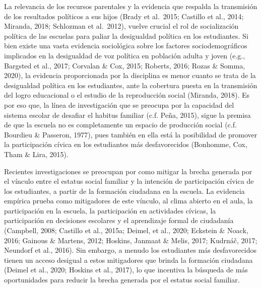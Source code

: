 \documentclass[12pt,twoside]{templates/facsothesis}
\begin{document}
La relevancia de los recursos parentales y la evidencia que respalda la transmisión de los resultados políticos a sus hijos (Brady et al.~2015; Castillo et al., 2014; Miranda, 2018; Schlozman et al.~2012), vuelve crucial el rol de socialización política de las escuelas para paliar la desigualdad política en los estudiantes. Si bien existe una vasta evidencia sociológica sobre los factores sociodemográficos implicados en la desigualdad de voz política en población adulta y joven (e.g., Bargsted et al., 2017; Corvalan \& Cox, 2015; Roberts, 2016; Rozas \& Somma, 2020), la evidencia proporcionada por la disciplina es menor cuanto se trata de la desigualdad política en los estudiantes, ante la cobertura puesta en la transmisión del logro educacional o el estudio de la reproducción social (Miranda, 2018). Es por eso que, la línea de investigación que se preocupa por la capacidad del sistema escolar de desafiar el habitus familiar (c.f. Peña, 2015), sigue la premisa de que la escuela no es completamente un espacio de producción social (c.f. Bourdieu \& Passeron, 1977), pues también en ella está la posibilidad de promover la participación cívica en los estudiantes más desfavorecidos (Bonhomme, Cox, Tham \& Lira, 2015).

Recientes investigaciones se preocupan por como mitigar la brecha generada por el vínculo entre el estatus social familiar y la intención de participación cívica de los estudiantes, a partir de la formación ciudadana en la escuela. La evidencia empírica prueba como mitigadores de este vínculo, al clima abierto en el aula, la participación en la escuela, la participación en actividades cívicas, la participación en decisiones escolares y el aprendizaje formal de ciudadanía (Campbell, 2008; Castillo et al., 2015a; Deimel, et al., 2020; Eckstein \& Noack, 2016; Gainous \& Martens, 2012; Hoskins, Janmaat \& Melis, 2017; Kudrnáč, 2017; Neundorf et al., 2016). Sin embargo, a menudo los estudiantes más desfavorecidos tienen un acceso desigual a estos mitigadores que brinda la formación ciudadana (Deimel et al., 2020; Hoskins et al., 2017), lo que incentiva la búsqueda de más oportunidades para reducir la brecha generada por el estatus social familiar.
\end{document}
